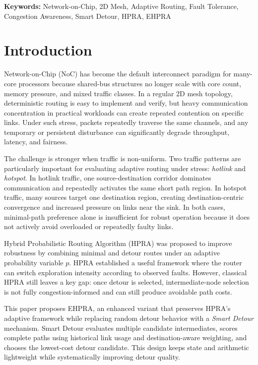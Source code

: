 \documentclass[10pt,a4paper]{article}
\begin{document}
\textbf{Keywords:} Network-on-Chip, 2D Mesh, Adaptive Routing, Fault Tolerance, Congestion Awareness, Smart Detour, HPRA, EHPRA

\section{Introduction}
Network-on-Chip (NoC) has become the default interconnect paradigm for many-core processors because shared-bus structures no longer scale with core count, memory pressure, and mixed traffic classes. In a regular 2D mesh topology, deterministic routing is easy to implement and verify, but heavy communication concentration in practical workloads can create repeated contention on specific links. Under such stress, packets repeatedly traverse the same channels, and any temporary or persistent disturbance can significantly degrade throughput, latency, and fairness.

The challenge is stronger when traffic is non-uniform. Two traffic patterns are particularly important for evaluating adaptive routing under stress: \emph{hotlink} and \emph{hotspot}. In hotlink traffic, one source-destination corridor dominates communication and repeatedly activates the same short path region. In hotspot traffic, many sources target one destination region, creating destination-centric convergence and increased pressure on links near the sink. In both cases, minimal-path preference alone is insufficient for robust operation because it does not actively avoid overloaded or repeatedly faulty links.

Hybrid Probabilistic Routing Algorithm (HPRA) was proposed to improve robustness by combining minimal and detour routes under an adaptive probability variable $p$. HPRA established a useful framework where the router can switch exploration intensity according to observed faults. However, classical HPRA still leaves a key gap: once detour is selected, intermediate-node selection is not fully congestion-informed and can still produce avoidable path costs.

This paper proposes EHPRA, an enhanced variant that preserves HPRA's adaptive framework while replacing random detour behavior with a \emph{Smart Detour} mechanism. Smart Detour evaluates multiple candidate intermediates, scores complete paths using historical link usage and destination-aware weighting, and chooses the lowest-cost detour candidate. This design keeps state and arithmetic lightweight while systematically improving detour quality.
\end{document}
